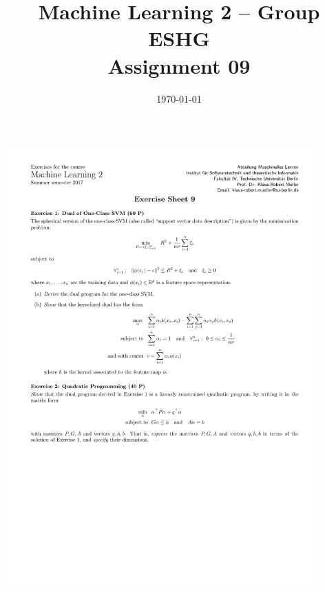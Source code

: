 \documentclass[11pt,a4paper]{article}
\title{Machine Learning 2 -- Group ESHG \\
        Assignment 09
}
\author{\students}
\date{\today}
\begin{document}
\maketitle

\includegraphics[clip, trim=0.5cm 2.5cm 0.5cm 4cm, width=0.90\textwidth]{sheet09.pdf}



\end{document}
